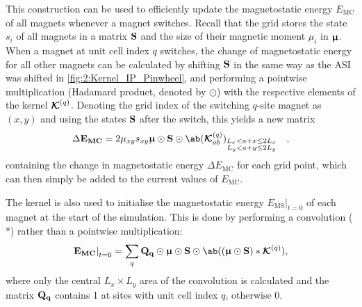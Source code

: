 This construction can be used to efficiently update the magnetostatic energy $E_\mathrm{MC}$ of all magnets whenever a magnet switches.
Recall that the grid stores the state $s_i$ of all magnets in a matrix $\boldsymbol{\mathbf{S}}$ and the size of their magnetic moment $\mu_i$ in $\boldsymbol{\mathbf{\upmu}}$.
When a magnet at unit cell index $q$ switches, the change of magnetostatic energy for all other magnets can be calculated by shifting $\boldsymbol{\mathbf{S}}$ in the same way as the ASI was shifted in \cref{fig:2:Kernel_IP_Pinwheel}, and performing a pointwise multiplication (Hadamard product, denoted by $\odot$) with the respective elements of the kernel $\boldsymbol{\mathbf{\mathcal{K}}}^{(q)}$.
Denoting the grid index of the switching $q$-site magnet as $(x,y)$ and using the states $\boldsymbol{\mathbf{S}}$ after the switch, this yields a new matrix
\begin{equation}
	\label{eq:2:Kernel_update}
	\Delta \vc{E_\mathrm{MC}} = 2\mu_{xy} s_{xy}\vc{\upmu} \odot \vc{S} \odot \ab(\vc{\mathcal{K}}^{(q)}_{ab})_{\substack{L_x < a + x \leq 2L_x \\ L_y < a + y \leq 2L_y}} \quad\mathrm{,}
\end{equation}
containing the change in magnetostatic energy $\Delta E_\mathrm{MC}$ for each grid point, which can then simply be added to the current values of $E_\mathrm{MC}$. \par
The kernel is also used to initialise the magnetostatic energy $\left. E_\mathrm{MS} \right|_{t=0}$ of each magnet at the start of the simulation.
This is done by performing a convolution ($*$) rather than a pointwise multiplication:
\begin{equation}
	\label{eq:2:Kernel_init}
	\left. \vc{E_\mathrm{MC}} \right|_{t=0} = \sum_q \vc{Q_q} \odot \vc{\upmu} \odot \vc{S} \odot \ab((\vc{\upmu} \odot \vc{S}) * \vc{\mathcal{K}}^{(q)}) \mathrm{,}
\end{equation}
where only the central $L_x \times L_y$ area of the convolution is calculated and the matrix $\boldsymbol{\mathbf{Q_q}}$ contains 1 at sites with unit cell index $q$, otherwise 0. \\\par


